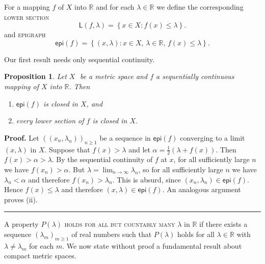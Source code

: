 \documentclass[11pt]{article}%
\newtheorem{proposition}[theorem]{Proposition}
\newenvironment{proof}[1][Proof]{\noindent\textbf{#1.} }{\ \rule{0.5em}{0.5em}}
\begin{document}
For a mapping $f$ of $X$ into $\mathbb{R}$ and for each $\lambda\in\mathbb{R}$
we define the corresponding \textsc{lower section}%
\[
\mathsf{L}\left(  f,\lambda\right)  =\left\{  x\in X:f(x)\leqslant
\lambda\right\}  .
\]
and \textsc{epigraph}%
\[
\mathsf{epi}(f)=\left\{  \left(  x,\lambda\right)  :x\in X,\,\lambda
\in\mathbb{R}\mathbf{,\,}f(x)\leqslant\lambda\right\}  .
\]
%

\noindent
Our first result needs only sequential continuity.

\begin{proposition}
\label{may12p1}Let $X\,$\ be a metric space and $f$ a sequentially continuous
mapping of $X$ into $\mathbb{R}$. Then

\begin{enumerate}
\item[\emph{(i)}] $\mathsf{epi}(f)$ is closed in $X$, and

\item[\emph{(ii)}] every lower section of $f$ is closed in $X$.
\end{enumerate}
\end{proposition}

\begin{proof}
Let $\left(  \left(  x_{n},\lambda_{n}\right)  \right)  _{n\geqslant1}$ be a
sequence in $\mathsf{epi}(f)$ converging to a limit $\left(  x,\lambda\right)
$ in $X$. Suppose that $f(x)>\lambda$ and let $\alpha=\frac{1}{2}%
(\lambda+f(x))$. Then $f(x)>\alpha>\lambda$. By the sequential continuity of
$f$ at $x$, for all sufficiently large $n$ we have $f(x_{n})>\alpha$. But
$\lambda=\lim_{n\rightarrow\infty}\lambda_{n}$, so for all sufficiently large
$n$ we have $\lambda_{n}<\alpha$ and therefore $f(x_{n})>\lambda_{n}$. This is
absurd, since $\left(  x_{n},\lambda_{n}\right)  \in\mathsf{epi}(f)$. Hence
$f(x)\leqslant\lambda$ and therefore $\left(  x,\lambda\right)  \in
\mathsf{epi}(f)$. An analogous argument proves (ii).
\end{proof}

%

\medskip


A property $P(\lambda)$ \textsc{holds for all but countably many} $\lambda$ in
$\mathbb{R}$ if there exists a sequence $\left(  \lambda_{m}\right)
_{m\geqslant1}$ of real numbers such that $P(\lambda)$ holds for all
$\lambda\in\mathbb{R}$ with $\lambda\neq\lambda_{m}$ for each $m$. We now
state without proof a fundamental result about compact metric spaces.
\end{document}
